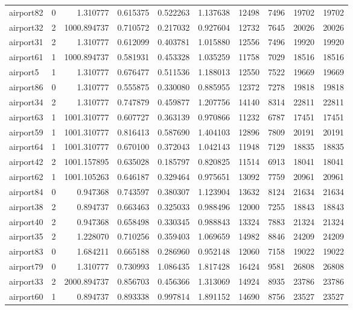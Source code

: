 \begin{longtable}{|l|r|r|r|r|r|r|r|r|r|}
airport82 & 0 & 1.310777 & 0.615375 & 0.522263 & 1.137638 & 12498 & 7496 & 19702 & 19702 \\
airport32 & 2 & 1000.894737 & 0.710572 & 0.217032 & 0.927604 & 12732 & 7645 & 20026 & 20026 \\
airport31 & 2 & 1.310777 & 0.612099 & 0.403781 & 1.015880 & 12556 & 7496 & 19920 & 19920 \\
airport61 & 1 & 1000.894737 & 0.581931 & 0.453328 & 1.035259 & 11758 & 7029 & 18516 & 18516 \\
airport5 & 1 & 1.310777 & 0.676477 & 0.511536 & 1.188013 & 12550 & 7522 & 19669 & 19669 \\
airport86 & 0 & 1.310777 & 0.555875 & 0.330080 & 0.885955 & 12372 & 7278 & 19818 & 19818 \\
airport34 & 2 & 1.310777 & 0.747879 & 0.459877 & 1.207756 & 14140 & 8314 & 22811 & 22811 \\
airport63 & 1 & 1001.310777 & 0.607727 & 0.363139 & 0.970866 & 11232 & 6787 & 17451 & 17451 \\
airport59 & 1 & 1001.310777 & 0.816413 & 0.587690 & 1.404103 & 12896 & 7809 & 20191 & 20191 \\
airport64 & 1 & 1001.310777 & 0.670100 & 0.372043 & 1.042143 & 11948 & 7129 & 18835 & 18835 \\
airport42 & 2 & 1001.157895 & 0.635028 & 0.185797 & 0.820825 & 11514 & 6913 & 18041 & 18041 \\
airport62 & 1 & 1001.105263 & 0.646187 & 0.329464 & 0.975651 & 13092 & 7759 & 20961 & 20961 \\
airport84 & 0 & 0.947368 & 0.743597 & 0.380307 & 1.123904 & 13632 & 8124 & 21634 & 21634 \\
airport38 & 2 & 0.894737 & 0.663463 & 0.325033 & 0.988496 & 12000 & 7255 & 18843 & 18843 \\
airport40 & 2 & 0.947368 & 0.658498 & 0.330345 & 0.988843 & 13324 & 7883 & 21324 & 21324 \\
airport35 & 2 & 1.228070 & 0.710256 & 0.359403 & 1.069659 & 14982 & 8846 & 24209 & 24209 \\
airport83 & 0 & 1.684211 & 0.665188 & 0.286960 & 0.952148 & 12060 & 7158 & 19022 & 19022 \\
airport79 & 0 & 1.310777 & 0.730993 & 1.086435 & 1.817428 & 16424 & 9581 & 26808 & 26808 \\
airport33 & 2 & 2000.894737 & 0.856703 & 0.456366 & 1.313069 & 14924 & 8935 & 23786 & 23786 \\
airport60 & 1 & 0.894737 & 0.893338 & 0.997814 & 1.891152 & 14690 & 8756 & 23527 & 23527 \\

\end{longtable}
